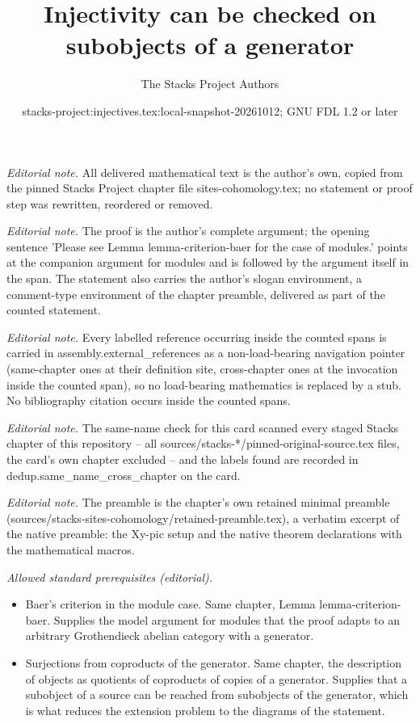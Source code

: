 \documentclass[10pt,a4paper]{amsart}
\title{Injectivity can be checked on subobjects of a generator}
\author{The Stacks Project Authors}
\date{stacks-project:injectives.tex:local-snapshot-20261012; GNU FDL 1.2 or later}
\theoremstyle{plain}
\theoremstyle{definition}
\theoremstyle{remark}
\numberwithin{equation}{subsection}
\begin{document}
\maketitle
\noindent\textit{Editorial note.} All delivered mathematical text is the author's own, copied from the pinned Stacks Project chapter file sites-cohomology.tex; no statement or proof step was rewritten, reordered or removed.\par\medskip
\noindent\textit{Editorial note.} The proof is the author's complete argument; the opening sentence 'Please see Lemma lemma-criterion-baer for the case of modules.' points at the companion argument for modules and is followed by the argument itself in the span. The statement also carries the author's slogan environment, a comment-type environment of the chapter preamble, delivered as part of the counted statement.\par\medskip
\noindent\textit{Editorial note.} Every labelled reference occurring inside the counted spans is carried in assembly.external\_references as a non-load-bearing navigation pointer (same-chapter ones at their definition site, cross-chapter ones at the invocation inside the counted span), so no load-bearing mathematics is replaced by a stub. No bibliography citation occurs inside the counted spans.\par\medskip
\noindent\textit{Editorial note.} The same-name check for this card scanned every staged Stacks chapter of this repository -- all sources/stacks-*/pinned-original-source.tex files, the card's own chapter excluded -- and the labels found are recorded in dedup.same\_name\_cross\_chapter on the card.\par\medskip
\noindent\textit{Editorial note.} The preamble is the chapter's own retained minimal preamble (sources/stacks-sites-cohomology/retained-preamble.tex), a verbatim excerpt of the native preamble: the Xy-pic setup and the native theorem declarations with the mathematical macros.\par\medskip
\noindent\textit{Allowed standard prerequisites (editorial).}\begin{itemize}
\item Baer's criterion in the module case. Same chapter, Lemma lemma-criterion-baer. Supplies the model argument for modules that the proof adapts to an arbitrary Grothendieck abelian category with a generator.
\item Surjections from coproducts of the generator. Same chapter, the description of objects as quotients of coproducts of copies of a generator. Supplies that a subobject of a source can be reached from subobjects of the generator, which is what reduces the extension problem to the diagrams of the statement.
\end{itemize}\medskip
\end{document}
